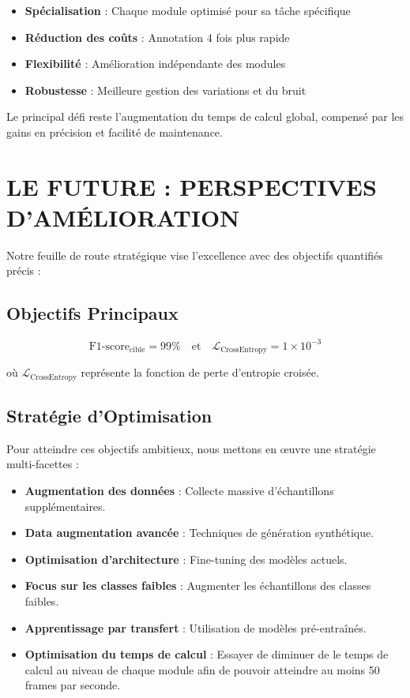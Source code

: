 \documentclass[letterpaper, 10 pt, conference]{ieeeconf}  %
\begin{document}
\begin{itemize}
\item \textbf{Spécialisation} : Chaque module optimisé pour sa tâche spécifique
\item \textbf{Réduction des coûts} : Annotation 4 fois plus rapide
\item \textbf{Flexibilité} : Amélioration indépendante des modules
\item \textbf{Robustesse} : Meilleure gestion des variations et du bruit
\end{itemize}

Le principal défi reste l'augmentation du temps de calcul global, compensé par les gains en précision et facilité de maintenance.

\section{LE FUTURE : PERSPECTIVES D'AMÉLIORATION}

Notre feuille de route stratégique vise l'excellence avec des objectifs quantifiés précis :

\subsection{Objectifs Principaux}

\begin{equation}
\text{F1-score}_{\text{cible}} = 99\% \quad \text{et} \quad \mathcal{L}_{\text{CrossEntropy}} = 1 \times 10^{-3}
\end{equation}

où $\mathcal{L}_{\text{CrossEntropy}}$ représente la fonction de perte d'entropie croisée.

\subsection{Stratégie d'Optimisation}

Pour atteindre ces objectifs ambitieux, nous mettons en œuvre une stratégie multi-facettes :

\begin{itemize}
\item \textbf{Augmentation des données} : Collecte massive d'échantillons supplémentaires.
\item \textbf{Data augmentation avancée} : Techniques de génération synthétique.
\item \textbf{Optimisation d'architecture} : Fine-tuning des modèles actuels.
\item \textbf{Focus sur les classes faibles} : Augmenter les échantillons des classes faibles.
\item \textbf{Apprentissage par transfert} : Utilisation de modèles pré-entraînés.
\item \textbf{Optimisation du temps de calcul} : Essayer de diminuer de le temps de calcul
au niveau de chaque module afin de pouvoir atteindre au moins 50 frames par seconde.
\end{itemize}
\end{document}
